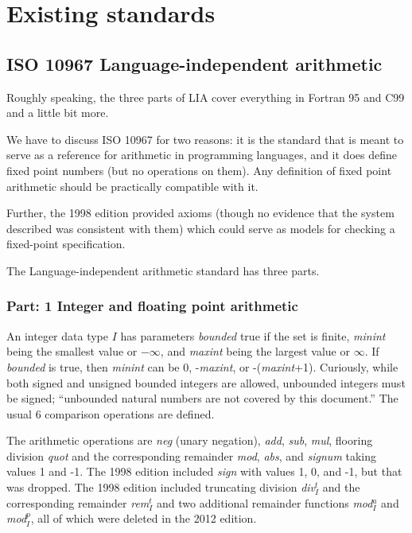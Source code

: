 \documentclass{article}
\begin{document}
\section{Existing standards}

\subsection{ISO 10967 Language-independent arithmetic}

Roughly speaking, the three parts of LIA cover everything
in Fortran 95 and C99 and a little bit more.

We have to discuss ISO 10967 for two reasons: it is the
standard that is meant to serve as a reference for arithmetic
in programming languages, and it does define fixed point
numbers (but no operations on them).  Any definition of
fixed point arithmetic should be practically compatible with it.

Further, the 1998 edition provided axioms (though no evidence
that the system described was consistent with them) which could
serve as models for checking a fixed-point specification.

The Language-independent arithmetic standard has three parts.

\subsubsection{Part: 1 Integer and floating point arithmetic}
An integer data type $I$ has parameters {\it bounded}\subI{}
true if the set is finite, {\it minint}\subI{} being the
smallest value or $-\infty$, and {\it maxint}\subI{} being the
largest value or $\infty$.  If {\it bounded}\subI{} is true,
then {\it minint}\subI{} can be 0, -{\it maxint}\subI{}, or
-({\it maxint}\subI{}+1).  Curiously, while both signed and
unsigned bounded integers are allowed, unbounded integers
must be signed; ``unbounded natural numbers are not covered
by this document.''  The usual 6 comparison operations are
defined.

The arithmetic operations are {\it neg}\subI{} (unary negation),
{\it add}\subI{}, {\it sub}\subI{}, {\it mul}\subI{},
flooring division {\it quot}\subI{} and the corresponding
remainder {\it mod}\subI{}, {\it abs}\subI{},
and {\it signum}\subI{} taking values 1 and -1.  The 1998 edition
included {\it sign}\subI{} with values 1, 0, and -1, but that was
dropped.  The 1998 edition included
truncating division {\it div}${}^t_I$ and the corresponding
remainder {\it rem}${}^t_I$ and two additional remainder functions
{\it mod}${}^a_I$ and {\it mod}${}^p_I$, all of which were deleted
in the 2012 edition.
\end{document}
